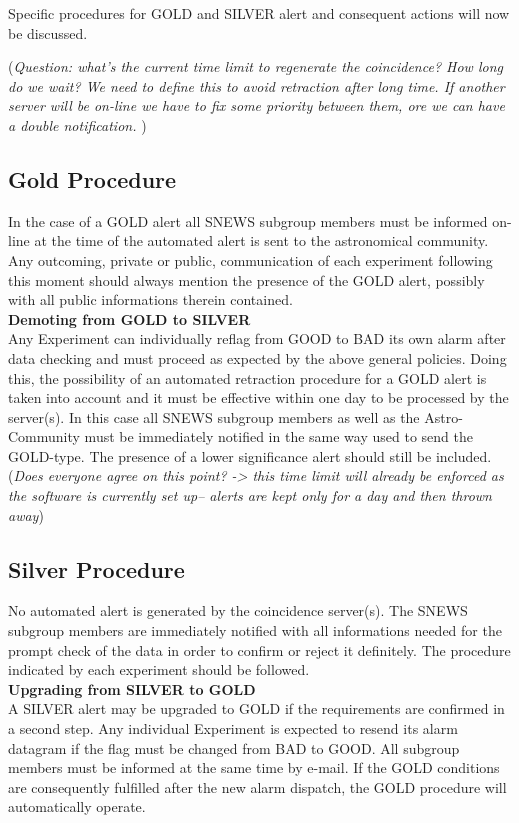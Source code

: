 \documentclass{article}
\begin{document}
{Specific procedures for GOLD and SILVER alert and consequent actions 
will now be discussed.

({\it Question: what's the current time limit to regenerate the coincidence?
How long do we wait? We need to define this to avoid retraction after long 
time. If another server will be on-line we have to fix some priority between 
them, ore we can have a double notification.
})

\subsection{Gold Procedure}

In the case of a GOLD alert all SNEWS subgroup members must be informed
on-line at the time of the automated alert is sent to the astronomical
community.
Any outcoming, private or public, communication of each experiment following 
this moment should always 
mention the presence of the GOLD alert, possibly with all public informations
therein contained.\\

{\bf Demoting from GOLD to SILVER}\\ Any Experiment can individually
reflag from GOOD to BAD its own alarm after data checking and must
proceed as expected by the above general policies.  Doing this, the
possibility of an automated retraction procedure for a GOLD alert is
taken into account and it must be effective within one day to be
processed by the server(s). In this case all SNEWS subgroup
members as well as the Astro-Community must be immediately notified in
the same way used to send the GOLD-type. The presence of a lower
significance alert should still be included.({\it Does everyone agree
on this point? -> this time limit will already be enforced as
the software is currently set up-- alerts are kept only for a day
and then thrown away})

\subsection{Silver Procedure}\label{silver}
No automated alert is generated by the coincidence server(s). 
The SNEWS subgroup members are immediately notified 
with all informations needed for the prompt check of the data in order to 
confirm or reject it definitely.
The procedure indicated by each experiment should be followed.\\


\textbf{Upgrading from SILVER to GOLD}\\
A SILVER alert may be upgraded to GOLD if the requirements are
confirmed in a second step. Any individual Experiment is expected to
resend its alarm datagram if the flag must be changed from BAD to
GOOD. All subgroup members must be informed at the same time by
e-mail. If the GOLD conditions are consequently fulfilled after the
new alarm dispatch, the GOLD procedure will automatically operate.

}
\end{document}
